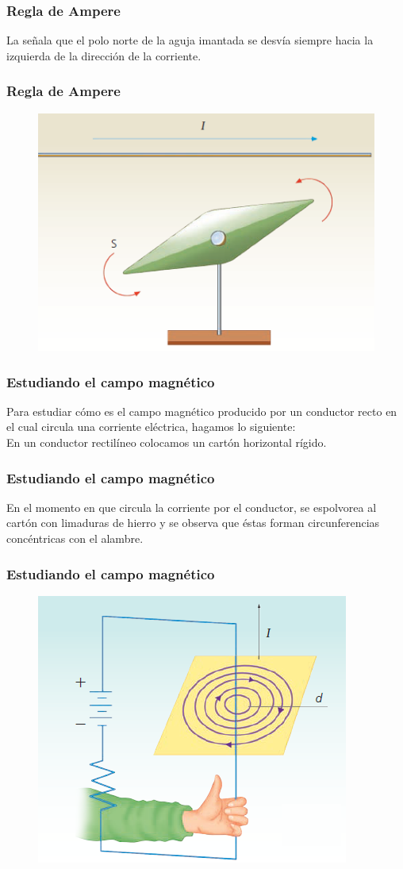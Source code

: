 \documentclass[14pt]{beamer}
\begin{document}
\begin{frame}
\frametitle{Regla de Ampere}
La  señala que el polo norte de la aguja imantada se desvía siempre hacia la izquierda de la dirección de la corriente.
\end{frame}
\begin{frame}
\frametitle{Regla de Ampere}
\begin{figure}
    \centering
    \includegraphics[scale=0.6]{Imagenes/Electromagnetismo_05.png}
\end{figure}
\end{frame}
\begin{frame}
\frametitle{Estudiando el campo magnético}
Para estudiar cómo es el campo magnético producido por un conductor recto en el cual circula una corriente eléctrica, hagamos lo siguiente:
\\
\bigskip
\pause
En un conductor rectilíneo colocamos un cartón horizontal rígido.
\end{frame}
\begin{frame}
\frametitle{Estudiando el campo magnético}
En el momento en que circula la corriente por el conductor, se espolvorea al cartón con limaduras de hierro y
se observa que éstas forman circunferencias concéntricas con el alambre.
\end{frame}
\begin{frame}
\frametitle{Estudiando el campo magnético}
\begin{figure}
    \centering
    \includegraphics[scale=0.6]{Imagenes/Electromagnetismo_06.png}
\end{figure}
\end{frame}
\end{document}
